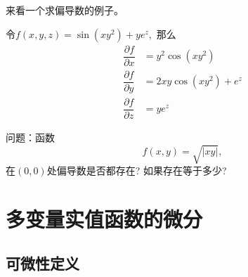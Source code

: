 
\begin{frame}

来看一个求偏导数的例子。

\pause

令$f(x,y,z) = \sin(xy^2) + ye^z,$ 那么
\begin{align*}
\dfrac{\partial f}{\partial x} & = y^2\cos(xy^2) \\
\dfrac{\partial f}{\partial y} & = 2xy\cos(xy^2) + e^z \\
\dfrac{\partial f}{\partial z} & = ye^z
\end{align*}

\pause

问题：函数
\[f(x,y) = \sqrt{|xy|},\]
在$(0,0)$处偏导数是否都存在? 如果存在等于多少?

\end{frame}



\section{多变量实值函数的微分}


\subsection{可微性定义}


